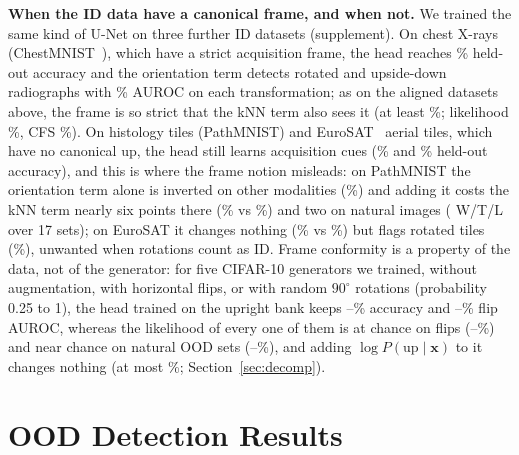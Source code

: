 \documentclass{article}
\newcommand{\up}{\mathrm{up}}
\begin{document}
\textbf{When the ID data have a canonical frame, and when not.} We trained the same kind of U-Net on three further ID datasets (supplement). On chest X-rays (ChestMNIST~\cite{yang2023medmnist}), which have a strict acquisition frame, the head reaches \xrAcc\% held-out accuracy and the orientation term detects rotated and upside-down radiographs with \xrRotPose\% AUROC on each transformation; as on the aligned datasets above, the frame is so strict that the kNN term also sees it (at least \xrRotKnnT\%; likelihood \xrRotNLL\%, CFS \xrRotCfs\%). On histology tiles (PathMNIST) and EuroSAT~\cite{helber2019eurosat} aerial tiles, which have no canonical up, the head still learns acquisition cues (\phAcc\% and \eAcc\% held-out accuracy), and this is where the frame notion misleads: on PathMNIST the orientation term alone is inverted on other modalities (\phModPose\%) and adding it costs the kNN term nearly six points there (\phMod\% vs \phModKnnT\%) and two on natural images (\phWtlKnnT{} W/T/L over 17 sets); on EuroSAT it changes nothing (\eOurs\% vs \eKnnT\%) but flags rotated tiles (\eRot\%), unwanted when rotations count as ID. Frame conformity is a property of the data, not of the generator: for five CIFAR-10 generators we trained, without augmentation, with horizontal flips, or with random $90^\circ$ rotations (probability 0.25 to 1), the head trained on the upright bank keeps \rgAccMin--\rgAccMax\% accuracy and \rgPoseVfMin--\rgPoseVfMax\% flip AUROC, whereas the likelihood of every one of them is at chance on flips (\rgNllVfMin--\rgNllVfMax\%) and near chance on natural OOD sets (\rgNllNatMin--\rgNllNatMax\%), and adding $\log P(\up\mid\mathbf{x})$ to it changes nothing (at most \rgNllUpVfMax\%; Section~\ref{sec:decomp}).

\section{OOD Detection Results}
\label{sec:results}
\end{document}
